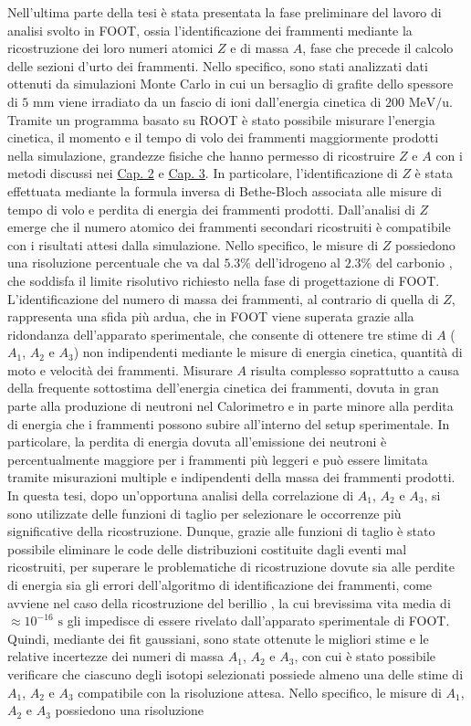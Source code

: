 \documentclass[12pt,a4paper,twoside]{report}
\begin{document}
	Nell'ultima parte della tesi è stata presentata la fase preliminare del lavoro di analisi svolto in FOOT, ossia l'identificazione dei frammenti mediante la ricostruzione dei loro numeri atomici $Z$ e di massa $A$, fase che precede il calcolo delle sezioni d'urto dei frammenti. Nello specifico, sono stati analizzati dati ottenuti da simulazioni Monte Carlo in cui un bersaglio di grafite dello spessore di $5\mbox{ mm}$ viene irradiato da un fascio di ioni  dall'energia cinetica di $200 \mbox{ MeV/u}$. Tramite un programma basato su ROOT è stato possibile misurare l'energia cinetica, il momento e il tempo di volo dei frammenti maggiormente prodotti nella simulazione, grandezze fisiche che hanno permesso di ricostruire $Z$ e $A$ con i metodi discussi nei \hyperref[cap:2]{Cap. 2} e \hyperref[cap:3]{Cap. 3}. In particolare, l'identificazione di $Z$ è stata effettuata mediante la formula inversa di Bethe-Bloch associata alle misure di tempo di volo e perdita di energia dei frammenti prodotti. Dall'analisi di $Z$ emerge che il numero atomico dei frammenti secondari ricostruiti è compatibile con i risultati attesi dalla simulazione. Nello specifico, le misure di $Z$ possiedono una risoluzione percentuale che va dal $5.3\%$ dell'idrogeno  al $2.3\%$ del carbonio , che soddisfa il limite risolutivo richiesto nella fase di progettazione di FOOT. L'identificazione del numero di massa dei frammenti, al contrario di quella di $Z$, rappresenta una sfida più ardua, che in FOOT viene superata grazie alla ridondanza dell'apparato sperimentale, che consente di ottenere tre stime di $A$ ($A_1$, $A_2$ e $A_3$) non indipendenti mediante le misure di energia cinetica, quantità di moto e velocità dei frammenti. Misurare $A$ risulta complesso soprattutto a causa della frequente sottostima dell'energia cinetica dei frammenti, dovuta in gran parte alla produzione di neutroni nel Calorimetro e in parte minore alla perdita di energia che i frammenti possono subire all'interno del setup sperimentale. In particolare, la perdita di energia dovuta all'emissione dei neutroni è percentualmente maggiore per i frammenti più leggeri e può essere limitata tramite misurazioni multiple e indipendenti della massa dei frammenti prodotti. In questa tesi, dopo un'opportuna analisi della correlazione di $A_1$, $A_2$ e $A_3$, si sono utilizzate delle funzioni di taglio per selezionare le occorrenze più significative della ricostruzione. Dunque, grazie alle funzioni di taglio è stato possibile eliminare le code delle distribuzioni costituite dagli eventi mal ricostruiti, per superare le problematiche di ricostruzione dovute sia alle perdite di energia sia gli errori dell'algoritmo di identificazione dei frammenti, come avviene nel caso della ricostruzione del berillio , la cui brevissima vita media di $\approx10^{-16}\mbox{ s}$ gli impedisce di essere rivelato dall'apparato sperimentale di FOOT. Quindi, mediante dei fit gaussiani, sono state ottenute le migliori stime e le relative incertezze dei numeri di massa $A_1$, $A_2$ e $A_3$, con cui è stato possibile verificare che ciascuno degli isotopi selezionati possiede almeno una delle stime di $A_1$, $A_2$ e $A_3$ compatibile con la risoluzione attesa. Nello specifico, le misure di $A_1$, $A_2$ e $A_3$ possiedono una risoluzione 
\end{document}
